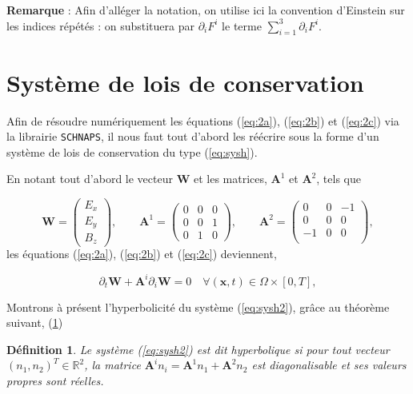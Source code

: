 \documentclass[a4paper,oneside,10pt]{report}
\newtheorem{mydef}{Définition}
\begin{document}
\textbf{Remarque } : Afin d'alléger la notation, on utilise ici la convention d'Einstein sur les indices répétés : on substituera par $\partial_i F^i$ le terme $\sum_{i=1}^{3}\partial _i F^i$.\newline


\section{Système de lois de conservation}

Afin de résoudre numériquement les équations (\ref{eq:2a}), (\ref{eq:2b}) et (\ref{eq:2c}) via la librairie \texttt{SCHNAPS}, il nous faut tout d'abord les réécrire sous la forme d'un système de lois de conservation du type (\ref{eq:sysh}).\newline

En notant tout d'abord le vecteur $\mathbf{W}$ et les matrices, $\mathbf{A}^1$ et $\mathbf{A}^2$, tels que

\begin{equation}
\mathbf{W}=
\begin{pmatrix}
E_x\\
E_y\\
B_z
\end{pmatrix},
\qquad
\mathbf{A}^1=
\begin{pmatrix}
0 & 0 & 0\\
0 & 0 & 1\\
0 & 1 & 0
\end{pmatrix},
\qquad
\mathbf{A}^2=
\begin{pmatrix}
0 & 0 & -1\\
0 & 0 & 0\\
-1 & 0 & 0\\
\end{pmatrix},
\end{equation}
les équations (\ref{eq:2a}), (\ref{eq:2b}) et (\ref{eq:2c}) deviennent,

\begin{equation}
\label{eq:sysh2}
\partial_t \mathbf{W} +  \mathbf{A}^i\partial_i \mathbf{W} = 0 \quad \forall (\mathbf{x},t) \in \Omega \times [0,T],
\end{equation}


Montrons à présent l'hyperbolicité du système (\ref{eq:sysh2}), grâce au théorème suivant, (\ref{})
\newline
\begin{mydef}
Le système (\ref{eq:sysh2}) est dit hyperbolique si pour tout vecteur $(n_1,n_2 )^T \in 
\mathbb{R}^2$, la matrice $\mathbf{A}^in_i = \mathbf{A}^1 n_1 + \mathbf{A}^2 n_2$ est diagonalisable et ses valeurs propres sont réelles.\newline
\end{mydef}
\end{document}
